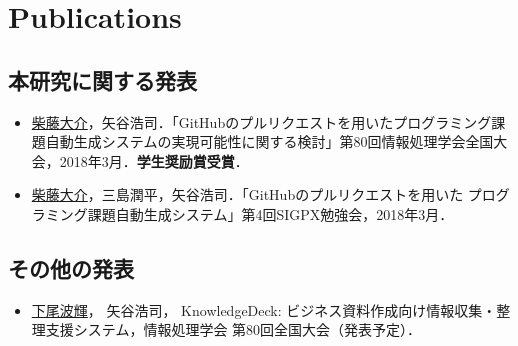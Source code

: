\chapter*{Publications}

\section*{本研究に関する発表}
\begin{itemize}
\item \underline{柴藤大介}，矢谷浩司．「GitHubのプルリクエストを用いたプログラミング課題自動生成システムの実現可能性に関する検討」第80回情報処理学会全国大会，2018年3月．\textbf{学生奨励賞受賞}．
\item \underline{柴藤大介}，三島潤平，矢谷浩司．「GitHubのプルリクエストを用いた プログラミング課題自動生成システム」第4回SIGPX勉強会，2018年3月．
\end{itemize}

\section*{その他の発表}
\begin{itemize}
\item\underline{下尾波輝}， 矢谷浩司， KnowledgeDeck: ビジネス資料作成向け情報収集・整理支援システム，情報処理学会 第80回全国大会（発表予定）．
\end{itemize}